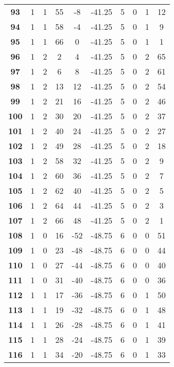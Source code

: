 \documentclass{article}%
\begin{document}
\begin{longtable}{cccccccccc}
        \textbf{93} & 1 & 1 & 55 & -8 & -41.25 & 5 & 0 & 1 & 12 \\ 
        \textbf{94} & 1 & 1 & 58 & -4 & -41.25 & 5 & 0 & 1 & 9 \\ 
        \textbf{95} & 1 & 1 & 66 & 0 & -41.25 & 5 & 0 & 1 & 1 \\ 
        \textbf{96} & 1 & 2 & 2 & 4 & -41.25 & 5 & 0 & 2 & 65 \\ 
        \textbf{97} & 1 & 2 & 6 & 8 & -41.25 & 5 & 0 & 2 & 61 \\ 
        \textbf{98} & 1 & 2 & 13 & 12 & -41.25 & 5 & 0 & 2 & 54 \\ 
        \textbf{99} & 1 & 2 & 21 & 16 & -41.25 & 5 & 0 & 2 & 46 \\ 
        \textbf{100} & 1 & 2 & 30 & 20 & -41.25 & 5 & 0 & 2 & 37 \\ 
        \textbf{101} & 1 & 2 & 40 & 24 & -41.25 & 5 & 0 & 2 & 27 \\ 
        \textbf{102} & 1 & 2 & 49 & 28 & -41.25 & 5 & 0 & 2 & 18 \\ 
        \textbf{103} & 1 & 2 & 58 & 32 & -41.25 & 5 & 0 & 2 & 9 \\ 
        \textbf{104} & 1 & 2 & 60 & 36 & -41.25 & 5 & 0 & 2 & 7 \\ 
        \textbf{105} & 1 & 2 & 62 & 40 & -41.25 & 5 & 0 & 2 & 5 \\ 
        \textbf{106} & 1 & 2 & 64 & 44 & -41.25 & 5 & 0 & 2 & 3 \\ 
        \textbf{107} & 1 & 2 & 66 & 48 & -41.25 & 5 & 0 & 2 & 1 \\ 
        \textbf{108} & 1 & 0 & 16 & -52 & -48.75 & 6 & 0 & 0 & 51 \\ 
        \textbf{109} & 1 & 0 & 23 & -48 & -48.75 & 6 & 0 & 0 & 44 \\ 
        \textbf{110} & 1 & 0 & 27 & -44 & -48.75 & 6 & 0 & 0 & 40 \\ 
        \textbf{111} & 1 & 0 & 31 & -40 & -48.75 & 6 & 0 & 0 & 36 \\ 
        \textbf{112} & 1 & 1 & 17 & -36 & -48.75 & 6 & 0 & 1 & 50 \\ 
        \textbf{113} & 1 & 1 & 19 & -32 & -48.75 & 6 & 0 & 1 & 48 \\ 
        \textbf{114} & 1 & 1 & 26 & -28 & -48.75 & 6 & 0 & 1 & 41 \\ 
        \textbf{115} & 1 & 1 & 28 & -24 & -48.75 & 6 & 0 & 1 & 39 \\ 
        \textbf{116} & 1 & 1 & 34 & -20 & -48.75 & 6 & 0 & 1 & 33 \\ 

\end{longtable}
\end{document}
